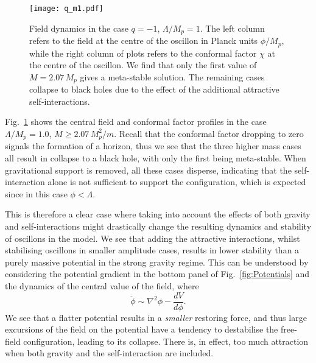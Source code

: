 \documentclass[11pt,a4paper]{article}
\begin{document}
\begin{figure}[h!]\centering
\begin{minipage}{\textwidth}
\texttt{[image: q\_m1.pdf]}
\caption[caption]{Field dynamics in the case $q=-1$, $\Lambda/M_p = 1$. The left column refers to the field at the centre of the oscillon in Planck units $\phi/M_p$, while the right column of plots refers to the conformal factor $\chi$ at the centre of the oscillon. We find that only the first value of $M=2.07 \, M_p$ gives a meta-stable solution. The remaining cases collapse to black holes due to the effect of the additional attractive self-interactions. \label{fig:qminus1} \footnotemark}
 \end{minipage}
\end{figure}
Fig.~\ref{fig:qminus1} shows the central field and conformal factor profiles in the case $\Lambda/M_p = 1.0$, $M \geq 2.07 \, M_p^2/m$. Recall that the conformal factor dropping to zero signals the formation of a horizon, thus we see that the three higher mass cases all result in collapse to a black hole, with only the first being meta-stable. When gravitational support is removed, all these cases disperse, indicating that the self-interaction alone is not sufficient to support the configuration, which is expected since in this case $\phi < \Lambda$.

This is therefore a clear case where taking into account the effects of both gravity and self-interactions might drastically change the resulting dynamics and stability of oscillons in the model. We see that adding the attractive interactions, whilst stabilising oscillons in smaller amplitude cases, results in lower stability than a purely massive potential in the strong gravity regime. This can be understood by considering the potential gradient in the bottom panel of Fig.~\ref{fig:Potentials} and the dynamics of the central value of the field, where
\begin{equation}
    \ddot \phi \sim \nabla^2 \phi - \frac{dV}{d\phi}.
\end{equation}
We see that a flatter potential results in a {\it smaller} restoring force, and thus large excursions of the field on the potential have a tendency to destabilise the free-field configuration, leading to its collapse. There is, in effect, too much attraction when both gravity and the self-interaction are included.
\end{document}
